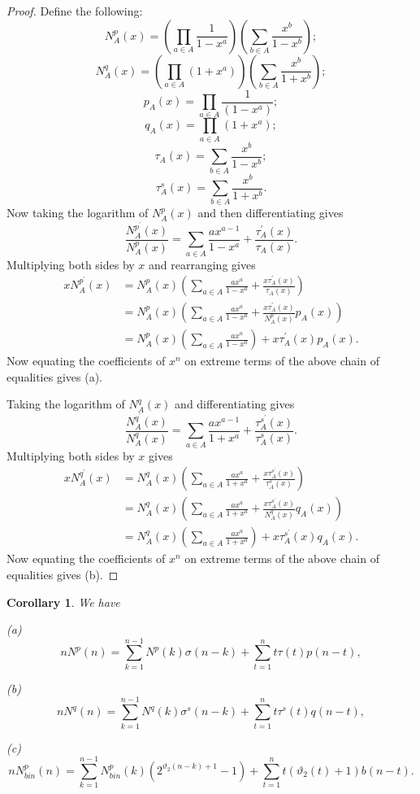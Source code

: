\documentclass[11pt]{article}
\newtheorem{corollary}{Corollary}
\begin{document}
\begin{proof}
Define the following:
\[N^p_A(x)=\left(\prod_{a\in A}\frac{1}{1-x^a}\right)\left(\sum_{b\in A}\frac{x^b}{1-x^b}\right);
\]
\[N^q_A(x)=\left(\prod_{a\in A}(1+x^a)\right)\left(\sum_{b\in A}\frac{x^b}{1+x^b}\right);
\]
\[p_A(x)=\prod_{a\in A}\frac{1}{(1-x^a)};
\]
\[q_A(x)=\prod_{a\in A}(1+x^a);
\]
\[\tau_A(x)=\sum_{b\in A}\frac{x^b}{1-x^b};
\]
\[\tau_A^s(x)=\sum_{b\in A}\frac{x^b}{1+x^b}.
\]
Now taking the logarithm of $N^p_A(x)$ and then differentiating gives 
\[
\frac{N^{p^\prime}_A(x)}{N^p_A(x)}=\sum_{a\in A}\frac{ax^{a-1}}{1-x^a}+\frac{\tau_A^\prime(x)}{\tau_A(x)}.
\]
Multiplying both sides by $x$ and rearranging gives 
\begin{align*}
xN^{p^\prime}_A(x)&=N^p_A(x)\left(\sum_{a\in A}\frac{ax^{a}}{1-x^a}+\frac{x\tau_A^\prime(x)}{\tau_A(x)}\right)\\
&=N^p_A(x)\left(\sum_{a\in A}\frac{ax^{a}}{1-x^a}+\frac{x\tau_A^\prime(x)}{N^p_A(x)}p_A(x)\right)\\
&=N^p_A(x)\left(\sum_{a\in A}\frac{ax^{a}}{1-x^a}\right)+x\tau_A ^\prime(x)p_A(x).
\end{align*}
Now equating the coefficients of $x^n$ on extreme terms of the above chain of equalities gives (a).

Taking the logarithm of $N^q_A(x)$ and differentiating gives
\[\frac{N^{q^\prime}_A(x)}{N^q_A(x)}=\sum_{a\in A}\frac{ax^{a-1}}{1+x^a}+\frac{\tau_A^{s^\prime}(x)}{\tau_A^s(x)}.
\]
Multiplying both sides by $x$ gives
\begin{align*}
xN^{q^\prime}_A(x)&=N^q_A(x)\left(\sum_{a\in A}\frac{ax^{a}}{1+x^a}+\frac{x\tau_A^{s^\prime}(x)}{\tau_A^s(x)}\right)\\
&=N^q_A(x)\left(\sum_{a\in A}\frac{ax^{a}}{1+x^a}+\frac{x\tau_A^{s^\prime}(x)}{N^q_A(x)}q_A(x)\right)\\ 
&=N^q_A(x)\left(\sum_{a\in A}\frac{ax^{a}}{1+x^a}\right)+x\tau_A^{s^\prime}(x)q_A(x).
\end{align*}
Now equating the coefficients of $x^n$ on extreme terms of the above chain of equalities gives (b).
\end{proof}
\begin{corollary}
We have
\begin{description}
\item{(a)}
\begin{equation}
nN^p(n)=\sum_{k=1}^{n-1}N^p(k)\sigma(n-k)+\sum_{t=1}^{n}t\tau(t)p(n-t),
\end{equation}
\item{(b)}
\begin{equation}
nN^q(n)=\sum_{k=1}^{n-1}N^q(k)\sigma^s(n-k)+\sum_{t=1}^{n}t\tau^s(t)q(n-t),
\end{equation}
\item{(c)}
\begin{equation}
nN_{bin}^p(n)=\sum_{k=1}^{n-1}N_{bin}^p(k)\left(2^{\vartheta_2(n-k)+1}-1\right)+\sum_{t=1}^nt(\vartheta_2(t)+1)b(n-t).
\end{equation}
\end{description}
\end{corollary}
\end{document}

